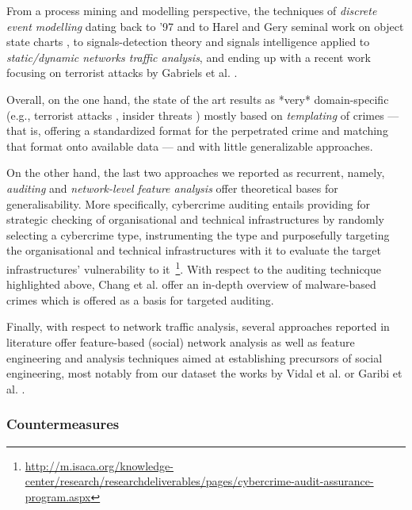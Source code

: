 From a process mining and modelling perspective, the techniques of \emph{discrete event modelling} dating back to '97 and to Harel and Gery seminal work on object state charts \cite{HarelGery1997}, to signals-detection theory \cite{Green1989} and signals intelligence \cite{MaLPLWZL18} applied to \emph{static/dynamic networks traffic analysis}, and ending up with a recent work focusing on terrorist attacks by Gabriels et al. \cite{abrielSBSGM17}.

Overall, on the one hand, the state of the art results as *very* domain-specific (e.g., terrorist attacks \cite{abrielSBSGM17}, insider threats \cite{Blackwell2009}) mostly based on \emph{templating} of crimes --- that is, offering a standardized format for the perpetrated crime and matching that format onto available data --- and with little generalizable approaches. 

On the other hand, the last two approaches we reported as recurrent, namely, \emph{auditing} and \emph{network-level feature analysis} offer theoretical bases for generalisability. More specifically, cybercrime auditing entails providing for strategic checking of organisational and technical infrastructures by randomly selecting a cybercrime type, instrumenting the type and purposefully targeting the organisational and technical infrastructures with it to evaluate the target infrastructures' vulnerability to it~\footnote{\url{http://m.isaca.org/knowledge-center/research/researchdeliverables/pages/cybercrime-audit-assurance-program.aspx}}. With respect to the auditing technicque highlighted above, Chang et al. \cite{ChangVWL13} offer an in-depth overview of malware-based crimes which is offered as a basis for targeted auditing.

Finally, with respect to network traffic analysis, several approaches reported in literature offer feature-based (social) network analysis \cite{ORiordanFN16} as well as feature engineering and analysis techniques aimed at establishing precursors of social engineering, most notably from our dataset the works by Vidal et al. \cite{VidalC17} or Garibi et al. \cite{abs-1201-0949}.

\subsubsection{Countermeasures}

